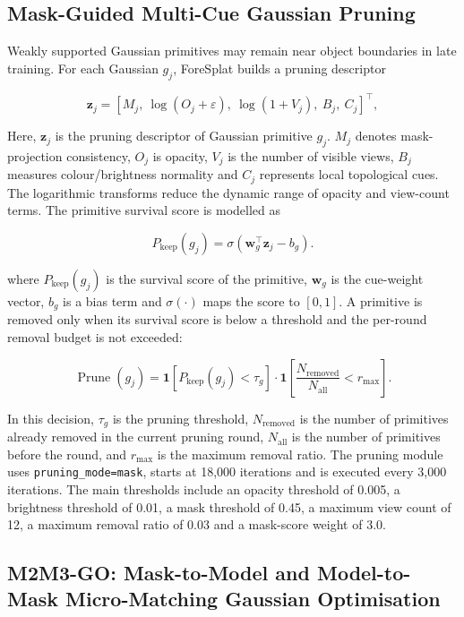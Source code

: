\documentclass[a4paper]{cas-sc}
\begin{document}
\subsection{Mask-Guided Multi-Cue Gaussian Pruning}\label{sec:mask-guided-multi-cue-gaussian-pruning}

Weakly supported Gaussian primitives may remain near object boundaries in late training. For each Gaussian \(g_j\), ForeSplat builds a pruning descriptor

\[
\mathbf{z}_j=\left[
M_j,\ \log(O_j+\varepsilon),\ \log(1+V_j),\ B_j,\ C_j
\right]^{\top},
\]

Here, \(\mathbf{z}_j\) is the pruning descriptor of Gaussian primitive \(g_j\). \(M_j\) denotes mask-projection consistency, \(O_j\) is opacity, \(V_j\) is the number of visible views, \(B_j\) measures colour/brightness normality and \(C_j\) represents local topological cues. The logarithmic transforms reduce the dynamic range of opacity and view-count terms. The primitive survival score is modelled as

\[
P_{\text{keep}}(g_j)=\sigma\left(\mathbf{w}_{g}^{\top}\mathbf{z}_j-b_g\right).
\]

where \(P_{\text{keep}}(g_j)\) is the survival score of the primitive, \(\mathbf{w}_g\) is the cue-weight vector, \(b_g\) is a bias term and \(\sigma(\cdot)\) maps the score to \([0,1]\). A primitive is removed only when its survival score is below a threshold and the per-round removal budget is not exceeded:

\[
\operatorname{Prune}(g_j)=\mathbf{1}\left[
P_{\text{keep}}(g_j)<\tau_g\right]\cdot
\mathbf{1}\left[\frac{N_{\text{removed}}}{N_{\text{all}}}<r_{\max}\right].
\]

In this decision, \(\tau_g\) is the pruning threshold, \(N_{\text{removed}}\) is the number of primitives already removed in the current pruning round, \(N_{\text{all}}\) is the number of primitives before the round, and \(r_{\max}\) is the maximum removal ratio. The pruning module uses \texttt{pruning\_mode=mask}, starts at 18,000 iterations and is executed every 3,000 iterations. The main thresholds include an opacity threshold of 0.005, a brightness threshold of 0.01, a mask threshold of 0.45, a maximum view count of 12, a maximum removal ratio of 0.03 and a mask-score weight of 3.0.


\subsection{M2M3-GO: Mask-to-Model and Model-to-Mask Micro-Matching Gaussian Optimisation}\label{sec:m2m3-go}
\end{document}
